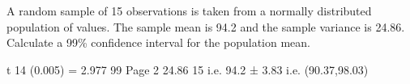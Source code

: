 A random sample of 15 observations is taken from a normally distributed population
of values. The sample mean is 94.2 and the sample variance is 24.86.
Calculate a 99\% confidence interval for the population mean.

t 14 (0.005) = 2.977
99%
Page 2
24.86
15
i.e. 94.2 ± 3.83 i.e. (90.37,98.03)
